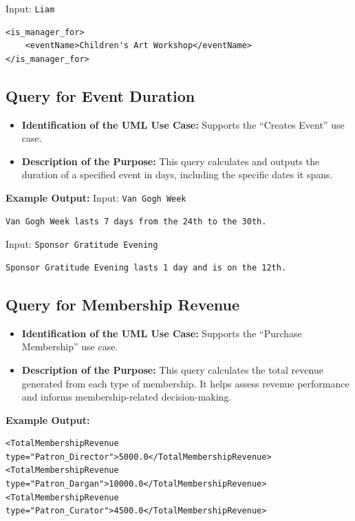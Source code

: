 \documentclass{article} %
\begin{document}
Input: \texttt{Liam}
\begin{verbatim}
<is_manager_for>
    <eventName>Children's Art Workshop</eventName>
</is_manager_for>
\end{verbatim}

\subsection{Query for Event Duration}
\begin{itemize}
    \item \textbf{Identification of the UML Use Case:} Supports the ``Creates Event'' use case.
    \item \textbf{Description of the Purpose:} This query calculates and outputs the duration of a specified event in days, including the specific dates it spans.
\end{itemize}

\textbf{Example Output:}  
Input: \texttt{Van Gogh Week}  
\begin{verbatim}
Van Gogh Week lasts 7 days from the 24th to the 30th.
\end{verbatim}

Input: \texttt{Sponsor Gratitude Evening}  
\begin{verbatim}
Sponsor Gratitude Evening lasts 1 day and is on the 12th.
\end{verbatim}

\subsection{Query for Membership Revenue}
\begin{itemize}
    \item \textbf{Identification of the UML Use Case:} Supports the ``Purchase Membership'' use case.
    \item \textbf{Description of the Purpose:} This query calculates the total revenue generated from each type of membership. It helps assess revenue performance and informs membership-related decision-making.
\end{itemize}

\textbf{Example Output:}
\begin{verbatim}
<TotalMembershipRevenue type="Patron_Director">5000.0</TotalMembershipRevenue>
<TotalMembershipRevenue type="Patron_Dargan">10000.0</TotalMembershipRevenue>
<TotalMembershipRevenue type="Patron_Curator">4500.0</TotalMembershipRevenue>
\end{verbatim}
\end{document}
